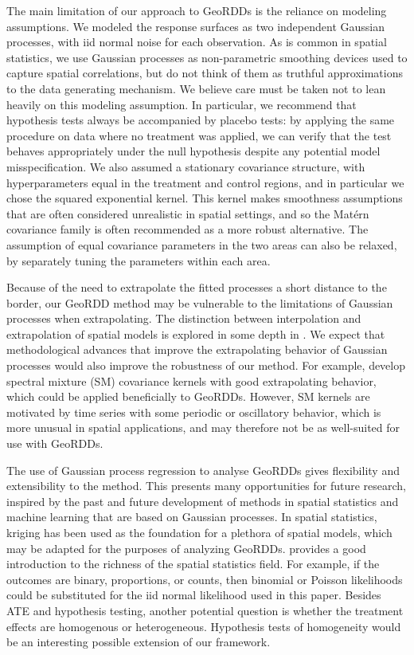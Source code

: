 \documentclass[letter,12pt]{article}
\begin{document}
The main limitation of our approach to GeoRDDs is the reliance on modeling assumptions.
We modeled the response surfaces as two independent Gaussian processes, with iid normal noise for each observation.
As is common in spatial statistics, we use Gaussian processes as non-parametric smoothing devices used to capture spatial correlations, but do not think of them as truthful approximations to the data generating mechanism.
We believe care must be taken not to lean heavily on this modeling assumption.
In particular, we recommend that hypothesis tests always be accompanied by placebo tests:
by applying the same procedure on data where no treatment was applied, we can verify that the test behaves appropriately under the null hypothesis despite any potential model misspecification.
We also assumed a stationary covariance structure, with hyperparameters equal in the treatment and control regions, and in particular we chose the squared exponential kernel.
This kernel makes smoothness assumptions that are often considered unrealistic in spatial settings, and so the Matérn covariance family is often recommended as a more robust alternative.
The assumption of equal covariance parameters in the two areas can also be relaxed, by separately tuning the parameters within each area.

Because of the need to extrapolate the fitted processes a short distance to the border, our GeoRDD method may be vulnerable to the limitations of Gaussian processes when extrapolating.
The distinction between interpolation and extrapolation of spatial models is explored in some depth in \cite{stein2012interpolation}.
We expect that methodological advances that improve the extrapolating behavior of Gaussian processes would also improve the robustness of our method.
For example, \cite{wilson2013gaussian} develop spectral mixture (SM) covariance kernels with good extrapolating behavior, which could be applied beneficially to GeoRDDs.
However, SM kernels are motivated by time series with some periodic or oscillatory behavior, which is more unusual in spatial applications, and may therefore not be as well-suited for use with GeoRDDs.



The use of Gaussian process regression to analyse GeoRDDs gives flexibility and extensibility to the method.
This presents many opportunities for future research, inspired by the past and future development of methods in spatial statistics and machine learning that are based on Gaussian processes.
In spatial statistics, kriging has been used as the foundation for a plethora of spatial models, which may be adapted for the purposes of analyzing GeoRDDs.
\cite{banerjee2014hierarchical} provides a good introduction to the richness of the spatial statistics field.
For example, if the outcomes are binary, proportions, or counts, then binomial or Poisson likelihoods could be substituted for the iid normal likelihood used in this paper.
Besides ATE and hypothesis testing, another potential question is whether the treatment effects are homogenous or heterogeneous.
Hypothesis tests of homogeneity would be an interesting possible extension of our framework.
\end{document}
